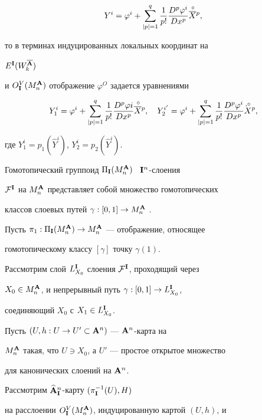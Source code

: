 \begin{pf}
$$


{Y}^{i}=


{\varphi}^{i}+\sum^q_{|p|=1}\frac{1}{p!}


\frac{D^p{\varphi}^{i}}{Dx^p}


\puto{\overline X}{}^p,


$$


то в терминах индуцированных локальных координат на


$E^{\bold I}(W^{\overline{{\bold A}}}_k)$


и $O^V_{\bold I}(M^{\bold A}_n)$ отображение $\varphi^O$ задается уравнениями


$$


{Y}_1^{i}={\varphi}^{i}+\sum^q_{|p|=1}\frac{1}{p!}


\frac{D^p{\varphi}{i}}{Dx^p}


\puto{\overline X}{}^p, \quad


{Y}_2^{i'}={\varphi}^{i}+\sum^q_{|p|=1}\frac{1}{p!}


\frac{D^p{\varphi}^{i}}{Dx^p}\Xop,


$$


где $Y^{i}_1=p_1(\widehat Y^{i})$, $Y^{i}_2=p_2(\widehat Y^{i})$.


 


Гомотопический группоид $\Pi_{{\bold I}}(M^{\bold A}_n)$ \ ${\bold I}^n$-слоения


${\cal F}^{\bold I}$ на $M^{\bold A}_n$ представляет собой множество гомотопических


классов слоевых путей $\gamma:[0,1]\to M^{\bold A}_n$ \cite{Rein}.


Пусть $\pi_1:\Pi_{{\bold I}}(M^{\bold A}_n)\to M^{\bold A}_n$ --- отображение, относящее


гомотопическому классу $[\gamma]$ точку $\gamma(1)$.


Рассмотрим слой $L^{\bold I}_{X_0}$ слоения ${\cal F}^{\bold I}$, проходящий через


$X_0\in M^{\bold A}_n$, и непрерывный путь $\gamma:[0,1]\to L^{\bold I}_{X_0}$,


соединяющий $X_0$ с $X_1\in L^{\bold I}_{X_0}$.


Пусть $(U,h:U\to U'\subset{\bold A}^n)$ --- ${\bold A}^n$-карта на


$M^{\bold A}_n$ такая, что $U\ni X_0$, а $U'$ --- простое открытое множество


\cite{Mol} для канонических слоений на ${\bold A}^n$.


Рассмотрим $\widehat{{\bold A}}_{\bold I}^n$-карту $(\pi^{-1}_{\bold I}(U),H)$


на расслоении $O^V_{\bold I}(M^{\bold A}_n)$, индуцированную картой $(U,h)$, и



\end{pf}
